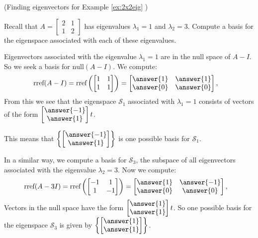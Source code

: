 \documentclass{ximera}
\begin{document}
\begin{example}\label{ex:eigvect2x2eig} (Finding eigenvectors for Example \ref{ex:2x2eig} )
    
Recall that $A=\begin{bmatrix} 2& 1\\ 1&2
\end{bmatrix}$ has eigenvalues $\lambda_1=1$ and $\lambda_2=3$.  Compute a basis for the eigenspace associated with each of these eigenvalues.
\begin{explanation}
Eigenvectors associated with the eigenvalue $\lambda_1=1$ are in the null space of $A-I$.  So we seek a basis for $\mbox{null}(A-I)$.  We compute:
\begin{align*}\mbox{rref}(A-I)=\mbox{rref}\left(\begin{bmatrix}1&1\\1&1\end{bmatrix}\right)&=\begin{bmatrix}\answer{1}&\answer{1}\\\answer{0}&\answer{0}\end{bmatrix},
\end{align*}
From this we see that the eigenspace $\mathcal{S}_1$ associated with $\lambda_1=1$ consists of vectors of the form $\begin{bmatrix}\answer{-1}\\\answer{1}\end{bmatrix}t$.

This means that $\left\{\begin{bmatrix}\answer{-1}\\\answer{1}\end{bmatrix}\right\}$
is one possible basis for $\mathcal{S}_1$.
    
In a similar way, we compute a basis for $\mathcal{S}_3$, the subspace of all eigenvectors associated with the eigenvalue $\lambda_2=3$.  Now we compute:
\begin{align*}\mbox{rref}(A-3I)=\mbox{rref}\left(\begin{bmatrix}-1&1\\1&-1\end{bmatrix}\right)&=\begin{bmatrix}\answer{1}&\answer{-1}\\\answer{0}&\answer{0}\end{bmatrix},
\end{align*}
Vectors in the null space have the form $\begin{bmatrix}\answer{1}\\\answer{1}\end{bmatrix}t$.  So one possible basis for the eigenspace $\mathcal{S}_3$ is given by $\left\{\begin{bmatrix}\answer{1}\\\answer{1}\end{bmatrix}\right\}$.
\end{explanation}
\end{example}
    
\end{document}
